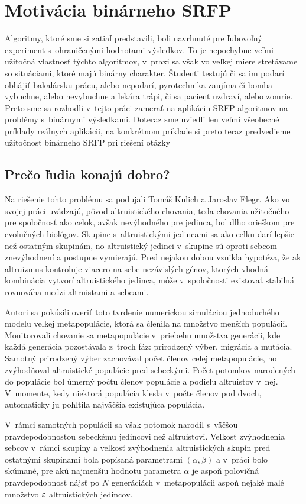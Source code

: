 \section{Motivácia binárneho SRFP}
Algoritmy, ktoré sme si zatiaľ predstavili, boli navrhnuté pre ľubovoľný
experiment s~ohraničenými hodnotami výsledkov. To je nepochybne veľmi užitočná
vlastnosť týchto algoritmov, v~praxi sa však vo veľkej miere stretávame so
situáciami, ktoré majú binárny charakter. Študenti testujú či sa im podarí
obhájiť bakalársku prácu, alebo nepodarí, pyrotechnika zaujíma čí bomba
vybuchne, alebo nevybuchne a lekára trápi, či sa pacient uzdraví, alebo zomrie.
Preto sme sa rozhodli v~tejto práci zamerať na aplikáciu SRFP algoritmov na
problémy s~binárnymi výsledkami. Doteraz sme uviedli len veľmi všeobecné
príklady reálnych aplikácii, na konkrétnom príklade si preto teraz predvedieme
užitočnosť binárneho SRFP pri riešení otázky
\subsection{Prečo ľudia konajú dobro?}
Na riešenie tohto problému sa podujali Tomáš Kulich a Jaroslav
Flegr\cite{kulich}. Ako vo svojej práci uvádzajú, pôvod altruistického
chovania, teda chovania užitočného pre spoločnosť ako celok, avšak nevýhodného
pre jedinca, bol dlho orieškom pre evolučných biológov. Skupine s~altruistickými
jedincami sa ako celku darí lepšie než ostatným skupinám, no altruistický
jedinci v~skupine sú oproti sebcom znevýhodnení a postupne vymierajú.
Pred nejakou dobou vznikla hypotéza, že ak altruizmus kontroluje viacero na sebe
nezávislých génov, ktorých vhodná kombinácia vytvorí altruistického jedinca,
môže v~spoločnosti existovať stabilná rovnováha medzi altruistami a sebcami. 

Autori sa pokúsili overiť toto tvrdenie numerickou simuláciou jednoduchého
modelu veľkej metapopulácie, ktorá sa členila na množstvo
menších populácii. Monitorovali chovanie sa metapopulácie v~priebehu množstva
generácii, kde každá generácia pozostávala z~troch fáz: prirodzený výber,
migrácia a mutácia. Samotný prirodzený výber zachovával počet členov celej
metapopulácie, no zvýhodňoval altruistické populácie pred sebeckými. Počet
potomkov narodených do populácie bol úmerný počtu členov populácie a podielu
altruistov v~nej. V~momente, kedy niektorá populácia klesla v~počte členov pod
dvoch, automaticky ju pohltila najväčšia existujúca populácia.

V~rámci samotných populácii sa však potomok narodil s~väčšou pravdepodobnosťou
sebeckému jedincovi než altruistovi. Veľkosť zvýhodnenia sebcov v~rámci skupiny
a veľkosť zvýhodnenia altruistických skupín pred ostatnými skupinami bola
popísaná parametrami $(\alpha, \beta)$ a v~práci bolo skúmané, pre akú najmenšiu
hodnotu parametra $\alpha$ je aspoň polovičná pravdepodobnosť nájsť po $N$
generáciách v~metapopulácii aspoň nejaké malé množstvo $\varepsilon$ altruistických
jedincov.

